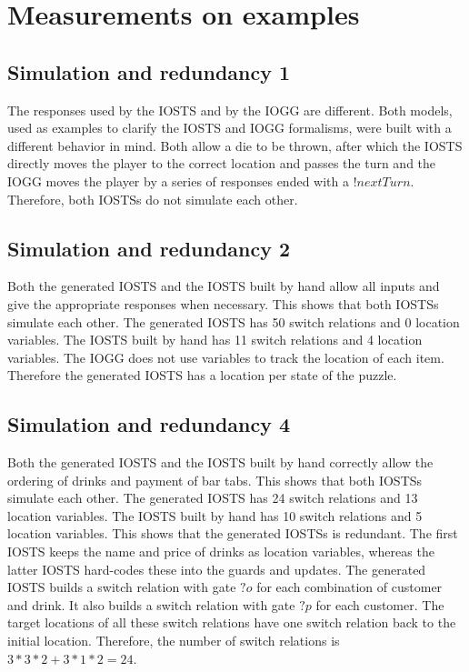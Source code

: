 \section{Measurements on examples}

\subsection{Simulation and redundancy 1}
The responses used by the IOSTS and by the IOGG are different. Both models, used as examples to clarify the IOSTS and IOGG formalisms, were built with a different behavior in mind. Both allow a die to be thrown, after which the IOSTS directly moves the player to the correct location and passes the turn and the IOGG moves the player by a series of responses ended with a $!nextTurn$. Therefore, both IOSTSs do not simulate each other.

\subsection{Simulation and redundancy 2}
Both the generated IOSTS and the IOSTS built by hand allow all inputs and give the appropriate responses when necessary. This shows that both IOSTSs simulate each other. The generated IOSTS has 50 switch relations and 0 location variables. The IOSTS built by hand has 11 switch relations and 4 location variables. The IOGG does not use variables to track the location of each item. Therefore the generated IOSTS has a location per state of the puzzle. 

\subsection{Simulation and redundancy 4}
Both the generated IOSTS and the IOSTS built by hand correctly allow the ordering of drinks and payment of bar tabs. This shows that both IOSTSs simulate each other. The generated IOSTS has 24 switch relations and 13 location variables. The IOSTS built by hand has 10 switch relations and 5 location variables. This shows that the generated IOSTSs is redundant. The first IOSTS keeps the name and price of drinks as location variables, whereas the latter IOSTS hard-codes these into the guards and updates. The generated IOSTS builds a switch relation with gate $?o$ for each combination of customer and drink. It also builds a switch relation with gate $?p$ for each customer. The target locations of all these switch relations have one switch relation back to the initial location. Therefore, the number of switch relations is $3*3*2+3*1*2 = 24$.

